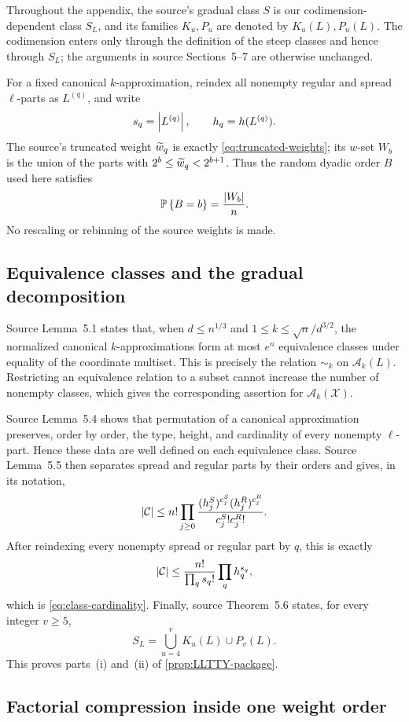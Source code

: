 \normalsize

Throughout the appendix, the source's gradual class $S$ is our codimension-dependent class $S_L$, and its families $K_u,P_u$ are denoted by $K_u(L),P_u(L)$. The codimension enters only through the definition of the steep classes and hence through $S_L$; the arguments in source Sections~5--7 are otherwise unchanged.

For a fixed canonical $k$-approximation, reindex all nonempty regular and spread $\ell$-parts as $L^{(q)}$, and write
\[
  s_q=\left|L^{(q)}\right|,
  \qquad
  h_q=h(L^{(q)}).
\]
The source's truncated weight $\widetilde w_q$ is exactly \eqref{eq:truncated-weights}; its $w$-set $W_b$ is the union of the parts with $2^b\le\widetilde w_q<2^{b+1}$. Thus the random dyadic order $B$ used here satisfies
\[
  \mathbb P\left\{B=b\right\}=\frac{\left|W_b\right|}n.
\]
No rescaling or rebinning of the source weights is made.

\subsection{Equivalence classes and the gradual decomposition}

Source Lemma~5.1 states that, when $d\le n^{1/3}$ and
$1\le k\le\sqrt n/d^{3/2}$, the normalized canonical $k$-approximations form at most $e^n$ equivalence classes under equality of the coordinate multiset. This is precisely the relation $\sim_k$ on $\mathcal A_k(L)$. Restricting an equivalence relation to a subset cannot increase the number of nonempty classes, which gives the corresponding assertion for $\mathcal A_k(\mathcal X)$.

Source Lemma~5.4 shows that permutation of a canonical approximation preserves, order by order, the type, height, and cardinality of every nonempty $\ell$-part. Hence these data are well defined on each equivalence class. Source Lemma~5.5 then separates spread and regular parts by their orders and gives, in its notation,
\[
  \left|\mathcal C\right|
  \le n!\prod_{j\ge0}
  \frac{(h_j^S)^{c_j^S}(h_j^R)^{c_j^R}}{c_j^S!c_j^R!}.
\]
After reindexing every nonempty spread or regular part by $q$, this is exactly
\[
  \left|\mathcal C\right|
  \le\frac{n!}{\prod_qs_q!}\prod_qh_q^{s_q},
\]
which is \eqref{eq:class-cardinality}. Finally, source Theorem~5.6 states, for every integer $v\ge5$,
\[
  S_L=\bigcup_{u=4}^{v}K_u(L)\cup P_v(L).
\]
This proves parts~(i) and~(ii) of \cref{prop:LLTTY-package}.

\subsection{Factorial compression inside one weight order}

